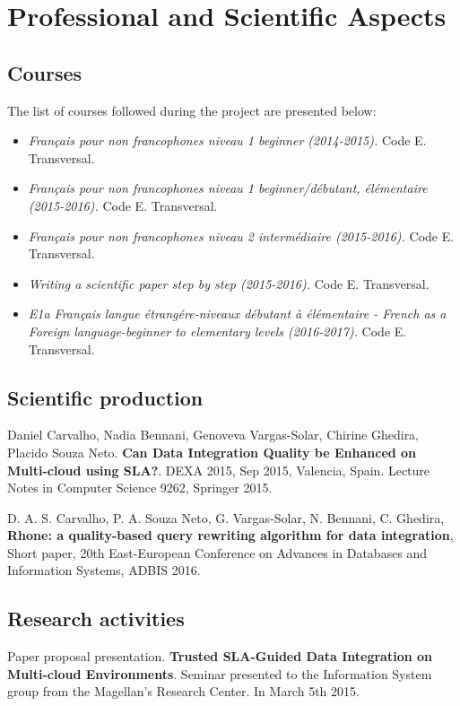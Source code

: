 \chapter{Professional and Scientific Aspects}
\label{chap:professional}
\minitoc

\section{Courses}
The list of courses followed during the project are presented below:
\begin{itemize}
\item \textit{Fran\c{c}ais pour non francophones niveau 1 beginner (2014-2015).} Code E. Transversal.
\item \textit{Fran\c{c}ais pour non francophones niveau 1 beginner/d\'ebutant, \'el\'ementaire (2015-2016).} Code E. Transversal.
\item \textit{Fran\c{c}ais pour non francophones niveau 2 interm\'ediaire (2015-2016).} Code E. Transversal.
\item \textit{Writing a scientific paper step by step (2015-2016).} Code E. Transversal.
\item \textit{E1a Fran\c{c}ais langue \'etrang\'ere-niveaux d\'ebutant \`a \'el\'ementaire - French as a Foreign language-beginner to elementary levels (2016-2017).} Code E. Transversal.
\end{itemize}

\section{Scientific production}

\noindent
Daniel Carvalho, Nadia Bennani, Genoveva Vargas-Solar, Chirine Ghedira, Placido Souza Neto. \textbf{Can Data Integration Quality be Enhanced on Multi-cloud using SLA?}. DEXA 2015, Sep 2015, Valencia, Spain. Lecture Notes in Computer Science 9262, Springer 2015.

\bigskip
\noindent D. A. S. Carvalho, P. A. Souza Neto, G. Vargas-Solar, N. Bennani, C. Ghedira, \textbf{Rhone: a quality-based
query rewriting algorithm for data integration}, Short paper, 20th East-European Conference on Advances
in Databases and Information Systems, ADBIS 2016.

\section{Research activities}

\noindent
Paper proposal presentation. \textbf{Trusted SLA-Guided Data Integration on Multi-cloud Environments}. Seminar presented to the Information System group from the Magellan's Research Center. In March 5th 2015.

